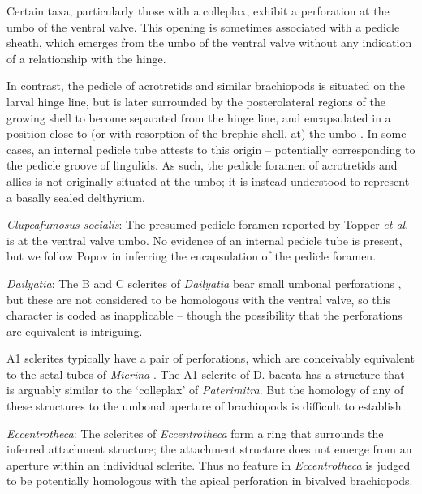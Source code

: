 \documentclass[openany]{book}
\theoremstyle{definition}
\theoremstyle{definition}
\theoremstyle{definition}
\theoremstyle{remark}
\begin{document}
Certain taxa, particularly those with a colleplax, exhibit a perforation
at the umbo of the ventral valve. This opening is sometimes associated
with a pedicle sheath, which emerges from the umbo of the ventral valve
without any indication of a relationship with the hinge.

In contrast, the pedicle of acrotretids and similar brachiopods is
situated on the larval hinge line, but is later surrounded by the
posterolateral regions of the growing shell to become separated from the
hinge line, and encapsulated in a position close to (or with resorption
of the brephic shell, at) the umbo \citep[see][pp.~407--411 and fig. 3
for discussion]{Popov1992TheCambrian}. In some cases, an internal
pedicle tube attests to this origin -- potentially corresponding to the
pedicle groove of lingulids. As such, the pedicle foramen of acrotretids
and allies is not originally situated at the umbo; it is instead
understood to represent a basally sealed delthyrium.

\hypertarget{Clupeafumosus_socialis-coding-114}{}
\emph{Clupeafumosus socialis}: The presumed pedicle foramen reported by
Topper \emph{et al}. \citeyearpar{Topper2013Reappraisalof} is at the
ventral valve umbo. No evidence of an internal pedicle tube is present,
but we follow Popov \citeyearpar{Popov1992TheCambrian} in inferring the
encapsulation of the pedicle foramen.

\hypertarget{Dailyatia-coding-114}{}
\emph{Dailyatia}: The B and C sclerites of \emph{Dailyatia} bear small
umbonal perforations \citep{Skovsted2015Theearly}, but these are not
considered to be homologous with the ventral valve, so this character is
coded as inapplicable -- though the possibility that the perforations
are equivalent is intriguing.

A1 sclerites typically have a pair of perforations, which are
conceivably equivalent to the setal tubes of \emph{Micrina}
\citep{Holmer2011Firstrecord}. The A1 sclerite of D. bacata has a
structure that is arguably similar to the `colleplax' of
\emph{Paterimitra}. But the homology of any of these structures to the
umbonal aperture of brachiopods is difficult to establish.

\hypertarget{Eccentrotheca-coding-114}{}
\emph{Eccentrotheca}: The sclerites of \emph{Eccentrotheca} form a ring
that surrounds the inferred attachment structure; the attachment
structure does not emerge from an aperture within an individual
sclerite. Thus no feature in \emph{Eccentrotheca} is judged to be
potentially homologous with the apical perforation in bivalved
brachiopods.
\end{document}
